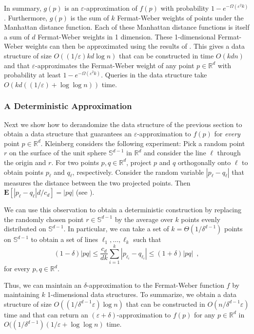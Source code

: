 \documentclass[charterfonts,lotsofwhite]{patmorin}
\newcommand{\eps}{\varepsilon}
\newcommand{\E}{\mathbf{E}}
\begin{document}
In summary, $g(p)$ is an $\eps$-approximation of $f(p)$ with
probability $1-e^{-\Omega(\eps^2k)}$.  Furthermore, $g(p)$ is the sum
of $k$ Fermat-Weber weights of points under the Manhattan distance
function.  Each of these Manhattan distance functions is itself a sum
of $d$ Fermat-Weber weights in 1 dimension.  These 1-dimensional
Fermat-Weber weights can then be approximated using the results of
.  This gives a data structure of size $O((1/\eps)kd\log
n)$ that can be constructed in time $O(kdn)$ and that
$\eps$-approximates the Fermat-Weber weight of any point
$p\in\mathbb{R}^d$ with probability at least $1-e^{-\Omega(\eps^2k)}$.
Queries in the data structure take $O(kd((1/\eps)+\log\log n))$ time.


\subsubsection{A Deterministic Approximation}

Next we show how to derandomize the data structure of the previous
section to obtain a data structure that guarantees an
$\eps$-approximation to $f(p)$ for \emph{every} point
$p\in\mathbb{R}^d$.  Kleinberg \cite{k97} considers the following
experiment:  Pick a random point $r$ on the surface of the unit sphere
$\mathbb{S}^{d-1}$ in $\mathbb{R}^d$ and consider the line $\ell$ through the
origin and $r$. For two points $p,q\in\mathbb{R}^d$, project $p$ and
$q$ orthogonally onto $\ell$ to obtain points $p_\ell$ and $q_\ell$,
respectively. Consider the random variable $|p_\ell-q_\ell|$ that
measures the distance between the two projected points.  Then
$\E[|p_\ell-q_\ell|d/c_d]=|pq|$ (see ).  

We can use this observation to obtain a deterministic construction by
replacing the randomly chosen point $r\in \mathbb{S}^{d-1}$ by the average over
$k$ points evenly distributed on $\mathbb{S}^{d-1}$.  In particular, we can
take a set of $k=\Theta(1/\delta^{d-1})$ points on $\mathbb{S}^{d-1}$ \cite{c00}
to obtain a set of lines $\ell_1,\ldots,\ell_k$ such that
\[
      (1-\delta)|pq|\le \frac{c_d}{dk} \sum_{i=1}^k |p_{\ell_i}-q_{\ell_i}| 
      \le (1+\delta)|pq| \enspace ,
\]
for every $p,q\in\mathbb{R}^d$.  

Thus, we can maintain an $\delta$-approximation to the Fermat-Weber
function $f$ by maintaining $k$ 1-dimensional data structures.  To
summarize, we obtain a data structure of size
$O((1/\delta^{d-1}\eps)\log n)$ that can be constructed in
$O(n/\delta^{d-1}\eps)$ time and that can return an
$(\eps+\delta)$-approximation to $f(p)$ for any $p\in\mathbb{R}^d$ in
$O((1/\delta^{d-1})(1/\eps + \log\log n)$ time.
\end{document}
